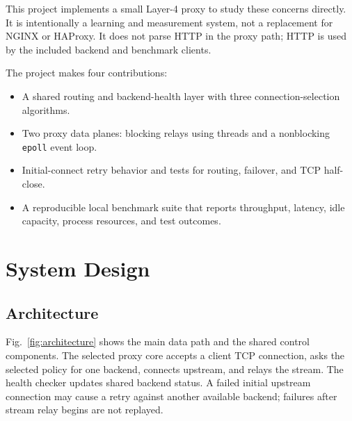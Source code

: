 \documentclass[conference]{IEEEtran}
\begin{document}
This project implements a small Layer-4 proxy to study these concerns directly. It is intentionally a learning and measurement system, not a replacement for NGINX or HAProxy. It does not parse HTTP in the proxy path; HTTP is used by the included backend and benchmark clients.

The project makes four contributions:
\begin{itemize}
  \item A shared routing and backend-health layer with three connection-selection algorithms.
  \item Two proxy data planes: blocking relays using threads and a nonblocking \texttt{epoll} event loop.
  \item Initial-connect retry behavior and tests for routing, failover, and TCP half-close.
  \item A reproducible local benchmark suite that reports throughput, latency, idle capacity, process resources, and test outcomes.
\end{itemize}

\section{System Design}
\subsection{Architecture}
Fig.~\ref{fig:architecture} shows the main data path and the shared control components. The selected proxy core accepts a client TCP connection, asks the selected policy for one backend, connects upstream, and relays the stream. The health checker updates shared backend status. A failed initial upstream connection may cause a retry against another available backend; failures after stream relay begins are not replayed.
\end{document}
